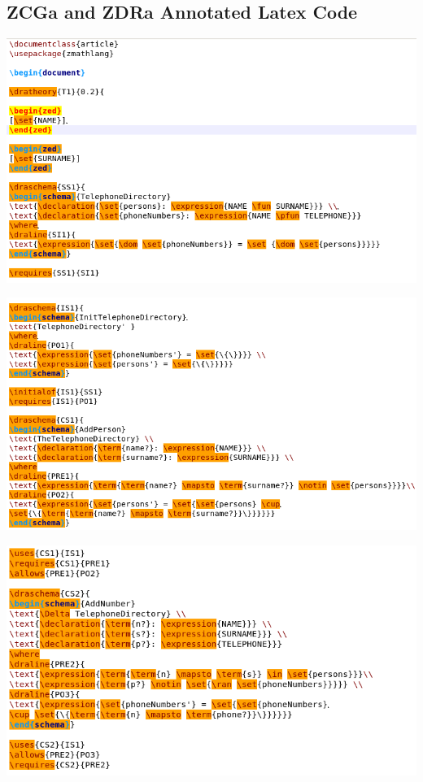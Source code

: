 %
\subsection{ZCGa and ZDRa Annotated Latex Code}
\label{app:nonzcga1n2}
\includegraphics[scale=0.5]{examples/nonworkzcga/1n2imagea.png}

\noindent \includegraphics[scale=0.5]{examples/nonworkzcga/1n2imageb.png}

\noindent \includegraphics[scale=0.5]{examples/nonworkzcga/1n2imagec.png}

